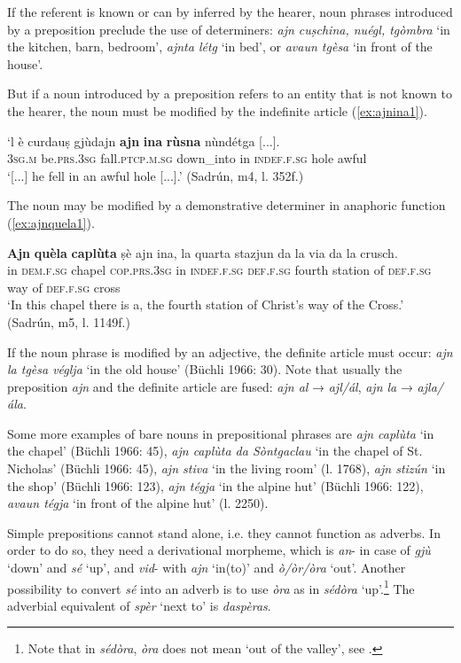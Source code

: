 If the referent is known or can by inferred by the hearer, noun phrases introduced by a preposition preclude the use of determiners: \textit{ajn cuṣchina, nuégl, tgòmbra} `in the kitchen, barn, bedroom', \textit{ajnta létg} `in bed', or \textit{avaun tgèsa} `in front of the house'.

But if a noun introduced by a preposition refers to an entity that is not known to the hearer, the noun must be modified by the indefinite article (\ref{ex:ajnina1}).

\ea
\label{ex:ajnina1}
\gll  [...] `l è curdauṣ gjùdajn \textbf{ajn} \textbf{ina} \textbf{rùsna} nùndétga [...].\\
{} \textsc{3sg.m} be.\textsc{prs.3sg} fall.\textsc{ptcp.m.sg} down\_into in \textsc{indef.f.sg} hole awful\\
\glt `[...] he fell in an awful hole [...].' (Sadrún, m4, l. 352f.)
\z

The noun may be modified by a demonstrative determiner in anaphoric function (\ref{ex:ajnquela1}).

\ea
\label{ex:ajnquela1}
\gll \textbf{Ajn} \textbf{quèla} \textbf{caplùta} ṣè ajn ina, la quarta stazjun da la via da la crusch.\\
in \textsc{dem.f.sg} chapel \textsc{cop.prs.3sg} in \textsc{indef.f.sg} \textsc{def.f.sg} fourth station of \textsc{def.f.sg} way of \textsc{def.f.sg} cross \\
\glt `In this chapel there is a, the fourth station of Christ’s way of the Cross.' (Sadrún, m5, l. 1149f.)
\z

If the noun phrase is modified by an adjective, the definite article must occur: \textit{ajn la tgèsa véglja} `in the old house' (Büchli 1966: 30). Note that usually the preposition \textit{ajn} and the definite article are fused: \textit{ajn al} → \textit{ajl/ál}, \textit{ajn la} → \textit{ajla/ála}.

Some more examples of bare nouns in prepositional phrases are \textit{ajn caplùta} `in the chapel' (Büchli 1966: 45), \textit{ajn caplùta da Sòntgaclau} `in the chapel of St. Nicholas' (Büchli 1966: 45), \textit{ajn stiva} `in the living room' (l. 1768), \textit{ajn stizún} `in the shop' (Büchli 1966: 123), \textit{ajn tégja} `in the alpine hut' (Büchli 1966: 122), \textit{avaun tégja} `in front of the alpine hut' (l. 2250).

Simple prepositions cannot stand alone, i.e. they cannot function as adverbs. In order to do so, they need a derivational morpheme, which is \textit{an}- in case of \textit{gjù} `down' and \textit{sé} `up', and \textit{vid}- with \textit{ajn} `in(to)' and \textit{ò/òr/òra} `out'. Another possibility to convert \textit{sé} into an adverb is to use \textit{òra} as in \textit{sédòra} `up'.\footnote{Note that in \textit{sédòra}, \textit{òra} does not mean `out of the valley', see  .} The adverbial equivalent of \textit{spèr} `next to' is \textit{daspèras}.


